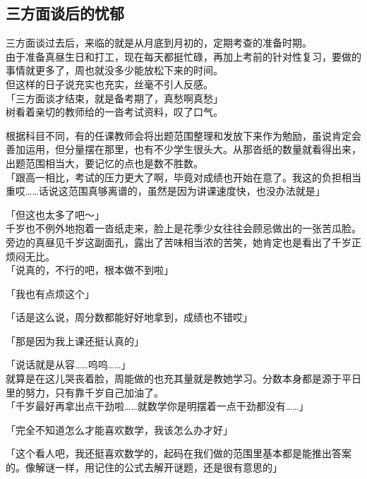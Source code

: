 \subsection{三方面谈后的忧郁}

三方面谈过去后，来临的就是从月底到月初的，定期考查的准备时期。\\

由于准备真昼生日和打工，现在每天都挺忙碌，再加上考前的针对性复习，要做的事情就更多了，周也就没多少能放松下来的时间。\\

但这样的日子说充实也充实，丝毫不引人反感。\\

「三方面谈才结束，就是备考期了，真愁啊真愁」\\

树看着亲切的教师给的一沓考试资料，叹了口气。

根据科目不同，有的任课教师会将出题范围整理和发放下来作为勉励，虽说肯定会善加运用，但分量摆在那里，也有不少学生很头大。从那沓纸的数量就看得出来，出题范围相当大，要记忆的点也是数不胜数。\\

「跟高一相比，考试的压力更大了啊，毕竟对成绩也开始在意了。我这的负担相当重哎……话说这范围真够离谱的，虽然是因为讲课速度快，也没办法就是」

「但这也太多了吧～」\\

千岁也不例外地抱着一沓纸走来，脸上是花季少女往往会顾忌做出的一张苦瓜脸。旁边的真昼见千岁这副面孔，露出了苦味相当浓的苦笑，她肯定也是看出了千岁正烦闷无比。\\

「说真的，不行的吧，根本做不到啦」

「我也有点烦这个」

「话是这么说，周分数都能好好地拿到，成绩也不错哎」

「那是因为我上课还挺认真的」

「说话就是从容……呜呜……」\\

就算是在这儿哭丧着脸，周能做的也充其量就是教她学习。分数本身都是源于平日里的努力，只有靠千岁自己加油了。\\

「千岁最好再拿出点干劲啦……就数学你是明摆着一点干劲都没有……」

「完全不知道怎么才能喜欢数学，我该怎么办才好」

「这个看人吧，我还挺喜欢数学的，起码在我们做的范围里基本都是能推出答案的。像解谜一样，用记住的公式去解开谜题，还是很有意思的」

